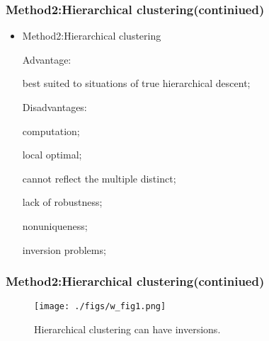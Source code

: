 \begin{frame}
    \frametitle{Method2:Hierarchical clustering(continiued)}
    \begin{itemize}
      \item Method2:Hierarchical clustering

    Advantage: 

    \hspace{0.6em}  best suited to situations of true hierarchical descent;

    Disadvantages:

    \hspace{0.6em}  computation;

    \hspace{0.6em}  local optimal;

    \hspace{0.6em}  cannot reflect the multiple distinct;

    \hspace{0.6em}  lack of robustness;

    \hspace{0.6em}  nonuniqueness;

    \hspace{0.6em}  inversion problems;
   \end{itemize}
\end{frame}

    

\begin{frame}
    \frametitle{Method2:Hierarchical clustering(continiued)}
    \begin{figure}[h]
        \centering
        \texttt{[image: ./figs/w\_fig1.png]}
        \label{Table1}
        \caption{Hierarchical clustering can have inversions.}
    \end{figure}
\end{frame}

